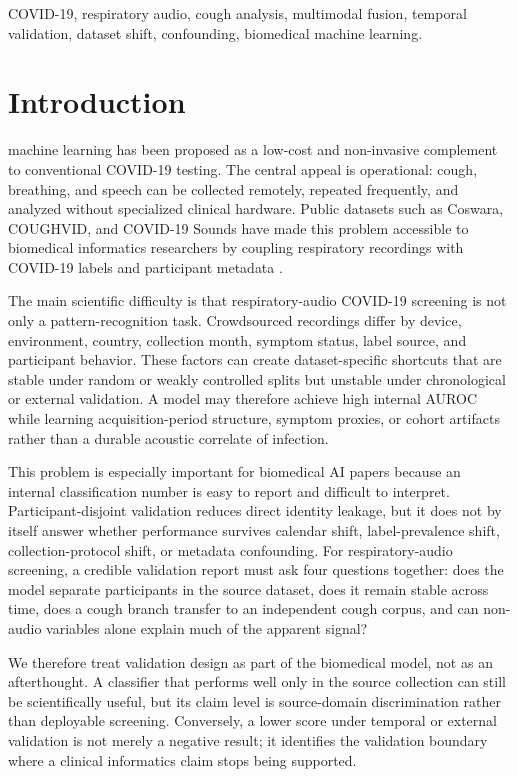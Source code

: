 \documentclass[journal]{IEEEtran}
\begin{document}
\begin{IEEEkeywords}
COVID-19, respiratory audio, cough analysis, multimodal fusion, temporal validation, dataset shift, confounding, biomedical machine learning.
\end{IEEEkeywords}

\section{Introduction}
 machine learning has been proposed as a low-cost and non-invasive complement to conventional COVID-19 testing. The central appeal is operational: cough, breathing, and speech can be collected remotely, repeated frequently, and analyzed without specialized clinical hardware. Public datasets such as Coswara, COUGHVID, and COVID-19 Sounds have made this problem accessible to biomedical informatics researchers by coupling respiratory recordings with COVID-19 labels and participant metadata \cite{bhattacharya2023coswara,orlandic2021coughvid,xia2021covid}.

The main scientific difficulty is that respiratory-audio COVID-19 screening is not only a pattern-recognition task. Crowdsourced recordings differ by device, environment, country, collection month, symptom status, label source, and participant behavior. These factors can create dataset-specific shortcuts that are stable under random or weakly controlled splits but unstable under chronological or external validation. A model may therefore achieve high internal AUROC while learning acquisition-period structure, symptom proxies, or cohort artifacts rather than a durable acoustic correlate of infection.

This problem is especially important for biomedical AI papers because an internal classification number is easy to report and difficult to interpret. Participant-disjoint validation reduces direct identity leakage, but it does not by itself answer whether performance survives calendar shift, label-prevalence shift, collection-protocol shift, or metadata confounding. For respiratory-audio screening, a credible validation report must ask four questions together: does the model separate participants in the source dataset, does it remain stable across time, does a cough branch transfer to an independent cough corpus, and can non-audio variables alone explain much of the apparent signal?

We therefore treat validation design as part of the biomedical model, not as an afterthought. A classifier that performs well only in the source collection can still be scientifically useful, but its claim level is source-domain discrimination rather than deployable screening. Conversely, a lower score under temporal or external validation is not merely a negative result; it identifies the validation boundary where a clinical informatics claim stops being supported.
\end{document}
